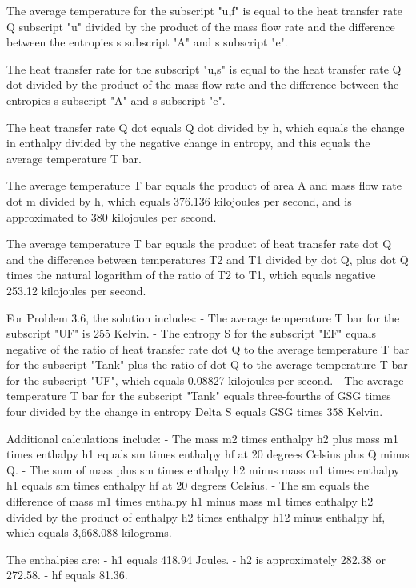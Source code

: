 The average temperature for the subscript "u,f" is equal to the heat transfer rate Q subscript "u" divided by the product of the mass flow rate and the difference between the entropies s subscript "A" and s subscript "e".

The heat transfer rate for the subscript "u,s" is equal to the heat transfer rate Q dot divided by the product of the mass flow rate and the difference between the entropies s subscript "A" and s subscript "e".

The heat transfer rate Q dot equals Q dot divided by h, which equals the change in enthalpy divided by the negative change in entropy, and this equals the average temperature T bar.

The average temperature T bar equals the product of area A and mass flow rate dot m divided by h, which equals 376.136 kilojoules per second, and is approximated to 380 kilojoules per second.

The average temperature T bar equals the product of heat transfer rate dot Q and the difference between temperatures T2 and T1 divided by dot Q, plus dot Q times the natural logarithm of the ratio of T2 to T1, which equals negative 253.12 kilojoules per second.

For Problem 3.6, the solution includes:
- The average temperature T bar for the subscript "UF" is 255 Kelvin.
- The entropy S for the subscript "EF" equals negative of the ratio of heat transfer rate dot Q to the average temperature T bar for the subscript "Tank" plus the ratio of dot Q to the average temperature T bar for the subscript "UF", which equals 0.08827 kilojoules per second.
- The average temperature T bar for the subscript "Tank" equals three-fourths of GSG times four divided by the change in entropy Delta S equals GSG times 358 Kelvin.

Additional calculations include:
- The mass m2 times enthalpy h2 plus mass m1 times enthalpy h1 equals sm times enthalpy hf at 20 degrees Celsius plus Q minus Q.
- The sum of mass plus sm times enthalpy h2 minus mass m1 times enthalpy h1 equals sm times enthalpy hf at 20 degrees Celsius.
- The sm equals the difference of mass m1 times enthalpy h1 minus mass m1 times enthalpy h2 divided by the product of enthalpy h2 times enthalpy h12 minus enthalpy hf, which equals 3,668.088 kilograms.

The enthalpies are:
- h1 equals 418.94 Joules.
- h2 is approximately 282.38 or 272.58.
- hf equals 81.36.